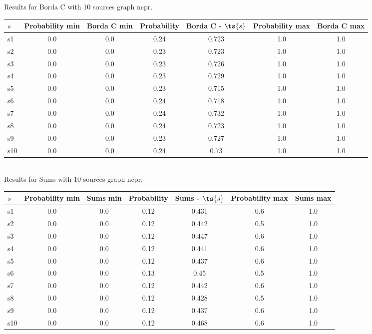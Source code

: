 \documentclass{article}
\begin{document}
\noindent Results for Borda C with 10 sources graph ncpr.

\noindent\begin{tabular}{|l|c|c|c|c|c|c|}
\hline
$s$& Probability min & Borda C min & Probability & Borda C - $\ts{s}$ & Probability max & Borda C max\\
\hline
s1 &0.0 & 0.0 & 0.24 & 0.723 & 1.0 & 1.0\\
\hline
s2 &0.0 & 0.0 & 0.23 & 0.723 & 1.0 & 1.0\\
\hline
s3 &0.0 & 0.0 & 0.23 & 0.726 & 1.0 & 1.0\\
\hline
s4 &0.0 & 0.0 & 0.23 & 0.729 & 1.0 & 1.0\\
\hline
s5 &0.0 & 0.0 & 0.23 & 0.715 & 1.0 & 1.0\\
\hline
s6 &0.0 & 0.0 & 0.24 & 0.718 & 1.0 & 1.0\\
\hline
s7 &0.0 & 0.0 & 0.24 & 0.732 & 1.0 & 1.0\\
\hline
s8 &0.0 & 0.0 & 0.24 & 0.723 & 1.0 & 1.0\\
\hline
s9 &0.0 & 0.0 & 0.23 & 0.727 & 1.0 & 1.0\\
\hline
s10 &0.0 & 0.0 & 0.24 & 0.73 & 1.0 & 1.0\\
\hline
\end{tabular}\\

\noindent Results for Sums with 10 sources graph ncpr.

\noindent\begin{tabular}{|l|c|c|c|c|c|c|}
\hline
$s$& Probability min & Sums min & Probability & Sums - $\ts{s}$ & Probability max & Sums max\\
\hline
s1 &0.0 & 0.0 & 0.12 & 0.431 & 0.6 & 1.0\\
\hline
s2 &0.0 & 0.0 & 0.12 & 0.442 & 0.5 & 1.0\\
\hline
s3 &0.0 & 0.0 & 0.12 & 0.447 & 0.6 & 1.0\\
\hline
s4 &0.0 & 0.0 & 0.12 & 0.441 & 0.6 & 1.0\\
\hline
s5 &0.0 & 0.0 & 0.12 & 0.437 & 0.6 & 1.0\\
\hline
s6 &0.0 & 0.0 & 0.13 & 0.45 & 0.5 & 1.0\\
\hline
s7 &0.0 & 0.0 & 0.12 & 0.442 & 0.6 & 1.0\\
\hline
s8 &0.0 & 0.0 & 0.12 & 0.428 & 0.5 & 1.0\\
\hline
s9 &0.0 & 0.0 & 0.12 & 0.437 & 0.6 & 1.0\\
\hline
s10 &0.0 & 0.0 & 0.12 & 0.468 & 0.6 & 1.0\\
\hline
\end{tabular}\\
\end{document}
